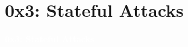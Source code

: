 \documentclass[aspectratio=169]{beamer}
\begin{document}
\section{0x3: Stateful Attacks}
{
\begin{frame}
\huge{\textcolor{white}{\textbf{0x3: Stateful Attacks}}}
\end{frame}
}
\end{document}
